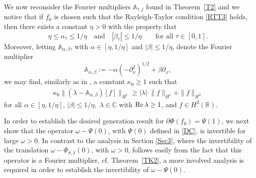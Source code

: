 \documentclass[11pt,reqno]{amsart}
\numberwithin{equation}{section}
\newcommand{\re}{\mathop{\rm Re}\nolimits}
\newcommand{\0}{\Omega}
\newcommand{\p}{\partial}
\newcommand{\bA}{\mathbb{A}}
\newcommand{\C}{\mathbb{C}}
\newcommand{\R}{\mathbb{R}}
\numberwithin{equation}{section}
\begin{document}
We now reconsider  the Fourier multipliers $\bA_{\tau,j}$ found in Theorem~\ref{T2} and  we notice that if $f_0$ is chosen such that the Rayleigh-Taylor condition \eqref{RTT3} holds, then there exists a constant $\eta>0$  with the property  that 
\[\eta\leq \alpha_\tau\leq1/\eta\quad\text{and}\quad |\beta_\tau|\leq 1/\eta \qquad\text{for all $\tau\in[0,1]$.} \]
Moreover, letting $\bA_{\alpha,\beta}$, with $\alpha\in[\eta,1/\eta]$ and $|\beta|\leq 1/\eta$, denote the Fourier multiplier
\[
\bA_{\alpha,\beta}:=-\alpha (-\p_x^2)^{1/2}+\beta\p_x,
\]
we may find, similarly as in \cite[Proposition 4.3]{M16x}, a constant  $\kappa_0\geq1$  such that  
  \begin{align}
 \kappa_0\|(\lambda-\bA_{\alpha,\beta})[f]\|_{H^1}\geq  |\lambda|\cdot\|f\|_{H^1}+\|f\|_{H^2}\label{14K**}
\end{align}
for all $\alpha\in[\eta,1/\eta]$, $|\beta|\leq 1/\eta,$   $\lambda\in\C$ with $\re \lambda\geq 1$, and $f\in H^2(\R)$.


In order to establish the desired generation result for $\p\Phi(f_0)=\Psi(1)$, we next show that the operator $\omega-\Psi(0)$, with $\Psi(0)$ defined in \eqref{DC}, is invertible  for large $\omega>0$. 
In contrast to the analysis in Section \ref{Sec3}, where the invertibility of  the translation $\omega-\Phi_{\sigma,1}(0)$, with $\omega>0$, follows easily from the fact that this operator is a Fourier multiplier, cf. Theorem~\ref{TK2},
a more involved analysis is required in order to establish the invertibility of $\omega-\Psi(0)$.

 
\end{document}
